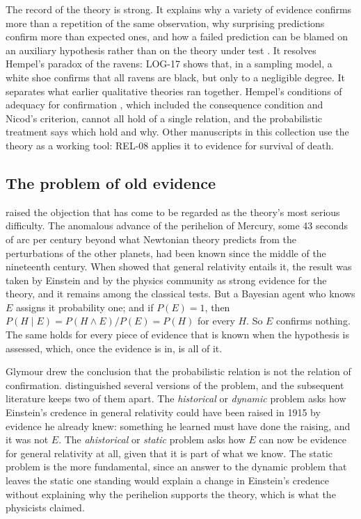 \documentclass{situationist-preprint}
\begin{document}
The record of the theory is strong. It explains why a variety of evidence confirms more than a repetition of the same observation, why surprising predictions confirm more than expected ones, and how a failed prediction can be blamed on an auxiliary hypothesis rather than on the theory under test \citep{Dorling1979,HowsonUrbach2006}. It resolves Hempel's paradox of the ravens: LOG-17 shows that, in a sampling model, a white shoe confirms that all ravens are black, but only to a negligible degree. It separates what earlier qualitative theories ran together. Hempel's conditions of adequacy for confirmation \citep{Hempel1945}, which included the consequence condition and Nicod's criterion, cannot all hold of a single relation, and the probabilistic treatment says which hold and why. Other manuscripts in this collection use the theory as a working tool: REL-08 applies it to evidence for survival of death.

\subsection{The problem of old evidence}

\citet[ch.~III]{Glymour1980} raised the objection that has come to be regarded as the theory's most serious difficulty. The anomalous advance of the perihelion of Mercury, some 43 seconds of arc per century beyond what Newtonian theory predicts from the perturbations of the other planets, had been known since the middle of the nineteenth century. When \citet{Einstein1915} showed that general relativity entails it, the result was taken by Einstein and by the physics community as strong evidence for the theory, and it remains among the classical tests. But a Bayesian agent who knows $E$ assigns it probability one; and if $P(E) = 1$, then $P(H \mid E) = P(H \wedge E)/P(E) = P(H)$ for every $H$. So $E$ confirms nothing. The same holds for every piece of evidence that is known when the hypothesis is assessed, which, once the evidence is in, is all of it.

Glymour drew the conclusion that the probabilistic relation is not the relation of confirmation. \citet{Eells1985} distinguished several versions of the problem, and the subsequent literature keeps two of them apart. The \emph{historical} or \emph{dynamic} problem asks how Einstein's credence in general relativity could have been raised in 1915 by evidence he already knew: something he learned must have done the raising, and it was not $E$. The \emph{ahistorical} or \emph{static} problem asks how $E$ can now be evidence for general relativity at all, given that it is part of what we know. The static problem is the more fundamental, since an answer to the dynamic problem that leaves the static one standing would explain a change in Einstein's credence without explaining why the perihelion supports the theory, which is what the physicists claimed.
\end{document}
